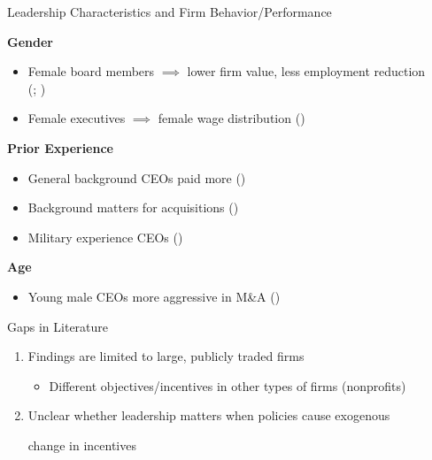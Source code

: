 \documentclass[notes,11pt, aspectratio=169]{beamer}
\begin{document}
\begin{frame}{Leadership Characteristics and Firm Behavior/Performance}

\large

\textbf{Gender}
\begin{itemize}
    \item \normalsize Female board members $\implies$ lower firm value, less employment reduction \\ \scriptsize(\cite{ahern2012changing}; \cite{matsa2013female}) \normalsize
    \item Female executives $\implies$ female wage distribution \scriptsize (\cite{flabbi2019female}) \normalsize
\end{itemize}

\vspace{4mm}

\textbf{Prior Experience}
\begin{itemize}
    \item \normalsize General background CEOs paid more \scriptsize (\cite{custodio2013generalists}) \normalsize
    \item Background matters for acquisitions \scriptsize(\cite{custodio2013ceos}) \normalsize

\vspace{1mm}
    
    \item Military experience CEOs \scriptsize (\cite{benmelech2015military})
\end{itemize}

\vspace{4mm}

\textbf{Age}
\begin{itemize}
    \item \normalsize Young male CEOs more aggressive in M\&A \scriptsize (\cite{levi2010deal})
\end{itemize}


\end{frame}

\begin{frame}{Gaps in Literature}
    \large
    \begin{enumerate}
        \item Findings are limited to large, publicly traded firms

\vspace{2mm}
        
        \begin{itemize}
            \item \normalsize Different objectives/incentives in other types of firms (nonprofits)
        \end{itemize}

        \vspace{10mm}
        
        \item Unclear whether leadership matters when policies cause exogenous 
        
        change in incentives
    \end{enumerate}
\end{frame}
\end{document}
